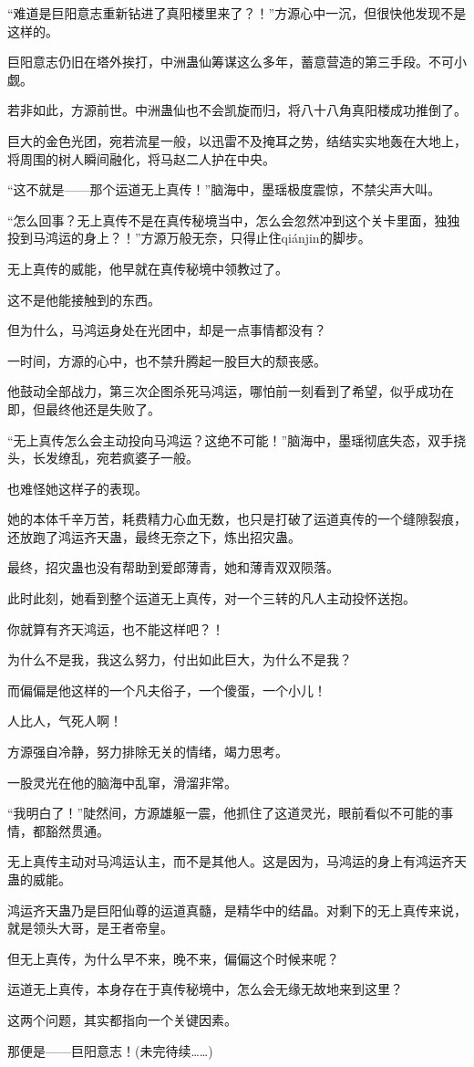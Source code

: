 \begin{this_body}
“难道是巨阳意志重新钻进了真阳楼里来了？！”方源心中一沉，但很快他发现不是这样的。

巨阳意志仍旧在塔外挨打，中洲蛊仙筹谋这么多年，蓄意营造的第三手段。不可小觑。

若非如此，方源前世。中洲蛊仙也不会凯旋而归，将八十八角真阳楼成功推倒了。

巨大的金色光团，宛若流星一般，以迅雷不及掩耳之势，结结实实地轰在大地上，将周围的树人瞬间融化，将马赵二人护在中央。

“这不就是——那个运道无上真传！”脑海中，墨瑶极度震惊，不禁尖声大叫。

“怎么回事？无上真传不是在真传秘境当中，怎么会忽然冲到这个关卡里面，独独投到马鸿运的身上？！”方源万般无奈，只得止住qiánjin的脚步。

无上真传的威能，他早就在真传秘境中领教过了。

这不是他能接触到的东西。

但为什么，马鸿运身处在光团中，却是一点事情都没有？

一时间，方源的心中，也不禁升腾起一股巨大的颓丧感。

他鼓动全部战力，第三次企图杀死马鸿运，哪怕前一刻看到了希望，似乎成功在即，但最终他还是失败了。

“无上真传怎么会主动投向马鸿运？这绝不可能！”脑海中，墨瑶彻底失态，双手挠头，长发缭乱，宛若疯婆子一般。

也难怪她这样子的表现。

她的本体千辛万苦，耗费精力心血无数，也只是打破了运道真传的一个缝隙裂痕，还放跑了鸿运齐天蛊，最终无奈之下，炼出招灾蛊。

最终，招灾蛊也没有帮助到爱郎薄青，她和薄青双双陨落。

此时此刻，她看到整个运道无上真传，对一个三转的凡人主动投怀送抱。

你就算有齐天鸿运，也不能这样吧？！

为什么不是我，我这么努力，付出如此巨大，为什么不是我？

而偏偏是他这样的一个凡夫俗子，一个傻蛋，一个小儿！

人比人，气死人啊！

方源强自冷静，努力排除无关的情绪，竭力思考。

一股灵光在他的脑海中乱窜，滑溜非常。

“我明白了！”陡然间，方源雄躯一震，他抓住了这道灵光，眼前看似不可能的事情，都豁然贯通。

无上真传主动对马鸿运认主，而不是其他人。这是因为，马鸿运的身上有鸿运齐天蛊的威能。

鸿运齐天蛊乃是巨阳仙尊的运道真髓，是精华中的结晶。对剩下的无上真传来说，就是领头大哥，是王者帝皇。

但无上真传，为什么早不来，晚不来，偏偏这个时候来呢？

运道无上真传，本身存在于真传秘境中，怎么会无缘无故地来到这里？

这两个问题，其实都指向一个关键因素。

那便是——巨阳意志！(未完待续……)

\end{this_body}

